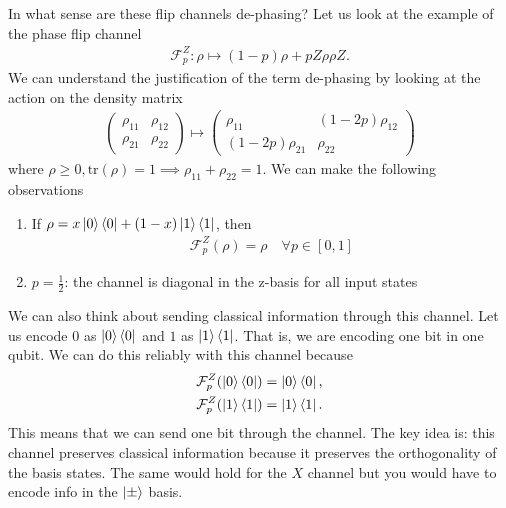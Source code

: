 \documentclass[../../note.tex]{subfiles}
\begin{document}
In what sense are these flip channels de-phasing? Let us look at the example of the phase flip channel
\begin{align}
    \mathcal{F}_{p}^{Z}: \rho \mapsto (1-p)\rho + p Z\rho \rho Z.
\end{align}
We can understand the justification of the term de-phasing by looking at the action on the density matrix
\begin{align}
    \begin{pmatrix}
    \rho_{11} & \rho_{12}\\
    \rho_{21} & \rho_{22}
    \end{pmatrix} \mapsto 
    \begin{pmatrix}
    \rho_{11} & (1-2p)\rho_{12}\\
    (1-2p)\rho_{21} & \rho_{22}
    \end{pmatrix}
\end{align}
where $\rho \geq 0, \text{tr}(\rho)=1 \implies \rho_{11}+\rho_{22}=1$. We can make the following observations
\begin{enumerate}
     \item If $\rho = x \ket{0}\bra{0} + (1-x)\ket{1}\bra{1}$, then 
     \begin{align}
         \mathcal{F}_p^Z(\rho)=\rho \quad \forall p\in [0,1]
     \end{align}
     \item $p=\frac{1}{2}$: the channel is diagonal in the z-basis for all input states
\end{enumerate}
We can also think about sending classical information through this channel. Let us encode $0$ as $\ket{0}\bra{0}$ and $1$ as $\ket{1}\bra{1}$. That is, we are encoding one bit in one qubit. We can do this reliably with this channel because
\begin{align}
    \mathcal{F}_p^Z (\ket{0}\bra{0}) &= \ket{0}\bra{0}, \\
     \mathcal{F}_p^Z (\ket{1}\bra{1}) &= \ket{1}\bra{1}.
\end{align}
This means that we can send one bit through the channel. The key idea is: this channel preserves classical information because it preserves the orthogonality of the basis states. The same would hold for the $X$ channel but you would have to encode info in the $\ket{\pm}$ basis. 
\end{document}
